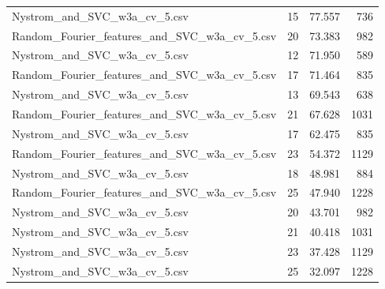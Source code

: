 \begin{tabularx}{\textwidth}{lrrr}
                Nystrom\_and\_SVC\_w3a\_cv\_5.csv &       15 &   77.557 &           736 \\
Random\_Fourier\_features\_and\_SVC\_w3a\_cv\_5.csv &       20 &   73.383 &           982 \\
                Nystrom\_and\_SVC\_w3a\_cv\_5.csv &       12 &   71.950 &           589 \\
Random\_Fourier\_features\_and\_SVC\_w3a\_cv\_5.csv &       17 &   71.464 &           835 \\
                Nystrom\_and\_SVC\_w3a\_cv\_5.csv &       13 &   69.543 &           638 \\
Random\_Fourier\_features\_and\_SVC\_w3a\_cv\_5.csv &       21 &   67.628 &          1031 \\
                Nystrom\_and\_SVC\_w3a\_cv\_5.csv &       17 &   62.475 &           835 \\
Random\_Fourier\_features\_and\_SVC\_w3a\_cv\_5.csv &       23 &   54.372 &          1129 \\
                Nystrom\_and\_SVC\_w3a\_cv\_5.csv &       18 &   48.981 &           884 \\
Random\_Fourier\_features\_and\_SVC\_w3a\_cv\_5.csv &       25 &   47.940 &          1228 \\
                Nystrom\_and\_SVC\_w3a\_cv\_5.csv &       20 &   43.701 &           982 \\
                Nystrom\_and\_SVC\_w3a\_cv\_5.csv &       21 &   40.418 &          1031 \\
                Nystrom\_and\_SVC\_w3a\_cv\_5.csv &       23 &   37.428 &          1129 \\
                Nystrom\_and\_SVC\_w3a\_cv\_5.csv &       25 &   32.097 &          1228 \\
\bottomrule
\end{tabularx}
